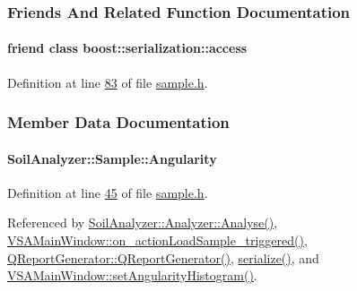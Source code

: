 \subsubsection{Friends And Related Function Documentation}
\hypertarget{class_soil_analyzer_1_1_sample_ac98d07dd8f7b70e16ccb9a01abf56b9c}{}
\paragraph[{boost\+::serialization\+::access}]{\setlength{\rightskip}{0pt plus 5cm}friend class boost\+::serialization\+::access\hspace{0.3cm}{\ttfamily [friend]}}\label{class_soil_analyzer_1_1_sample_ac98d07dd8f7b70e16ccb9a01abf56b9c}


Definition at line \hyperlink{sample_8h_source_l00083}{83} of file \hyperlink{sample_8h_source}{sample.\+h}.



\subsubsection{Member Data Documentation}
\hypertarget{class_soil_analyzer_1_1_sample_aac706ea1206fea6b708227c88481081d}{}
\paragraph[{Angularity}]{ Soil\+Analyzer\+::\+Sample\+::\+Angularity}\label{class_soil_analyzer_1_1_sample_aac706ea1206fea6b708227c88481081d}


Definition at line \hyperlink{sample_8h_source_l00045}{45} of file \hyperlink{sample_8h_source}{sample.\+h}.



Referenced by \hyperlink{analyzer_8cpp_source_l00065}{Soil\+Analyzer\+::\+Analyzer\+::\+Analyse()}, \hyperlink{vsamainwindow_8cpp_source_l00475}{V\+S\+A\+Main\+Window\+::on\+\_\+action\+Load\+Sample\+\_\+triggered()}, \hyperlink{qreportgenerator_8cpp_source_l00004}{Q\+Report\+Generator\+::\+Q\+Report\+Generator()}, \hyperlink{sample_8h_source_l00085}{serialize()}, and \hyperlink{vsamainwindow_8cpp_source_l00315}{V\+S\+A\+Main\+Window\+::set\+Angularity\+Histogram()}.

